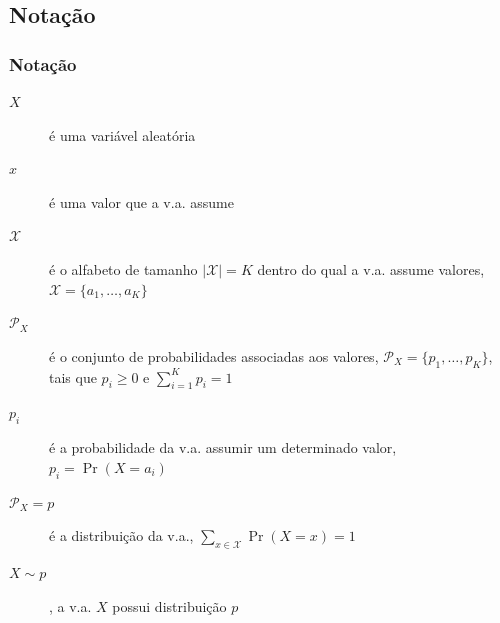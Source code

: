 \subsection{Notação}

\begin{frame}%
  \frametitle{Notação}
   \begin{description}
   \item[$X$] é uma variável aleatória
   \item[$x$] é uma valor que a v.a. assume
   \item[$\mathcal{X}$] é o alfabeto de tamanho $\vert \mathcal{X} \vert = K$ dentro do qual a v.a. assume valores, $\mathcal{X} = \{a_1, \ldots, a_K\}$
   \item[$\mathcal{P}_X$] é o conjunto de probabilidades associadas aos valores, $\mathcal{P}_X = \{p_1, \ldots, p_K\}$, tais que $p_i \geq 0$ e $\sum_{i=1}^K p_i = 1$
   \item[$p_i$] é a probabilidade da v.a. assumir um determinado valor, $p_i = \Pr(X=a_i)$
   \item[$\mathcal{P}_X = p$] é a distribuição da v.a., $\sum_{x \in \mathcal{X}} \Pr(X=x) = 1$
   \item[$X \sim p$], a v.a. $X$ possui distribuição $p$
   \end{description} 
\end{frame} 
